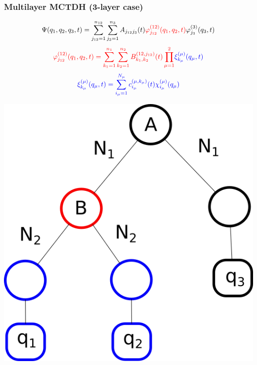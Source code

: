 \documentclass{beamer}
\begin{document}
\begin{frame}
  \frametitle{Multilayer MCTDH (3-layer case)}
  \begin{minipage}{0.3\linewidth}
    \tiny{
\begin{equation*}
	\Psi(q_1, q_2, q_3, t) = \sum_{j_{12}=1}^{n_{12}}\sum_{j_3 = 1}^{n_3}A_{j_{12}j_3}(t)\textcolor{red}{\varphi^{(12)}_{j_{12}}(q_1,q_2,t)}\varphi^{(3)}_{j_{3}}(q_3,t)
\end{equation*}
\begin{equation*}
	\textcolor{red}{\varphi^{(12)}_{j_{12}}(q_1,q_2,t) = \sum_{k_1 = 1}^{n_1}\sum_{k_2=1}^{n_2}B_{k_1,k_2}^{(12,j_{12})}(t)\prod_{\mu=1}^2} \textcolor{blue}{\xi_{k_{\mu}}^{(\mu)}(q_{\mu},t)}
\end{equation*}
\begin{equation*}
	\textcolor{blue}{\xi_{k_{\mu}}^{(\mu)}(q_{\mu},t) = \sum_{i_{\mu}=1}^{N_{\mu}} c_{i_{\mu}}^{(\mu,k_{\mu})}(t)\chi_{i_{\mu}}^{(\mu)}(q_{\mu})}
\end{equation*}}
\end{minipage}
\hfill
  \begin{minipage}{0.4\linewidth}
  \begin{center}
    \includegraphics[scale=.26]{mlmctdh.png}
  \end{center}
  \end{minipage}
\end{frame}
\end{document}
